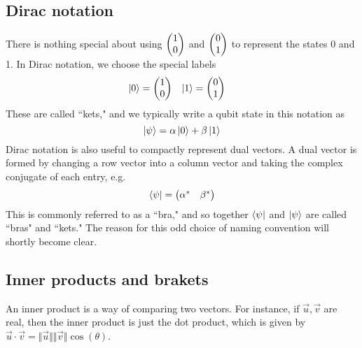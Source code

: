 \documentclass{article}
\begin{document}
\subsection{Dirac notation}
There is nothing special about using $\mqty(1 \\ 0)$ and $\mqty(0 \\1 )$ to represent the states 0 and 1. In Dirac notation, we choose the special labels
\begin{align*}
    \ket{0} &= \mqty(1 \\ 0) & \ket{1} &= \mqty(0 \\ 1)
\end{align*}
These are called ``kets," and we typically write a qubit state in this notation as
$$
\ket{\psi} = \alpha\ket{0} + \beta \ket{1}
$$
Dirac notation is also useful to compactly represent dual vectors. A dual vector is formed by changing a row vector into a column vector and taking the complex conjugate of each entry, e.g.
$$
\bra{\psi} = \mqty(\alpha^\ast & \beta^\ast)
$$
This is commonly referred to as a ``bra," and so together $\bra{\psi}$ and $\ket{\psi}$ are called ``bras" and ``kets." The reason for this odd choice of naming convention will shortly become clear.

\subsection{Inner products and brakets}
An inner product is a way of comparing two vectors. For instance, if $\vec u, \vec v$ are real, then the inner product is just the dot product, which is given by $\vec u \cdot \vec v = \Vert\vec u\Vert \Vert\vec v\Vert\cos(\theta)$. 
\end{document}
